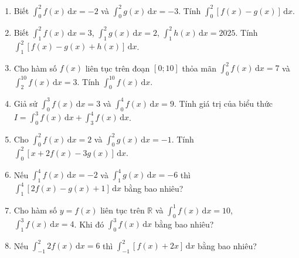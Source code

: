 \documentclass[12pt]{article}
\begin{document}
\begin{enumerate}[label=\textbf{Câu \arabic*.}]
		\item Biết $\displaystyle \int_0^2 f(x)\,\mathrm{d}x = -2$ và $\displaystyle \int_0^2 g(x)\,\mathrm{d}x = -3$. Tính $\displaystyle \int_0^2 [f(x)-g(x)]\,\mathrm{d}x$.
		\vspace{0.75cm}
		
		\item Biết $\displaystyle \int_1^2 f(x)\,\mathrm{d}x = 3$, $\displaystyle \int_1^2 g(x)\,\mathrm{d}x = 2$, $\displaystyle \int_1^2 h(x)\,\mathrm{d}x = 2025$. Tính $\displaystyle \int_1^2 [f(x)-g(x)+h(x)]\,\mathrm{d}x$.
		\vspace{0.75cm}
		
		\item Cho hàm số $f(x)$ liên tục trên đoạn $[0;10]$ thỏa mãn $\displaystyle \int_0^2 f(x)\,\mathrm{d}x = 7$ và $\displaystyle \int_2^{10} f(x)\,\mathrm{d}x = 3$. Tính $\displaystyle \int_0^{10} f(x)\,\mathrm{d}x$.
		\vspace{0.75cm}
		
		\item Giả sử $\displaystyle \int_0^3 f(x)\,\mathrm{d}x = 3$ và $\displaystyle \int_0^4 f(x)\,\mathrm{d}x = 9$. Tính giá trị của biểu thức $I = \displaystyle \int_0^3 f(x)\,\mathrm{d}x + \displaystyle \int_3^4 f(x)\,\mathrm{d}x$.
		\vspace{0.75cm}
		
		\item Cho $\displaystyle \int_0^2 f(x)\,\mathrm{d}x = 2$ và $\displaystyle \int_0^2 g(x)\,\mathrm{d}x = -1$. Tính $\displaystyle \int_0^2 [x+2f(x)-3g(x)]\,\mathrm{d}x$.
		\vspace{0.75cm}
		
		\item Nếu $\displaystyle \int_1^4 f(x)\,\mathrm{d}x = -2$ và $\displaystyle \int_1^4 g(x)\,\mathrm{d}x = -6$ thì $\displaystyle \int_1^4 [2f(x)-g(x)+1]\,\mathrm{d}x$ bằng bao nhiêu?
		\vspace{0.75cm}
		
		\item Cho hàm số $y = f(x)$ liên tục trên $\mathbb{R}$ và $\displaystyle \int_0^1 f(x)\,\mathrm{d}x = 10$, $\displaystyle \int_1^3 f(x)\,\mathrm{d}x = 4$. Khi đó $\displaystyle \int_0^3 f(x)\,\mathrm{d}x$ bằng bao nhiêu?
		\vspace{0.75cm}
		
		\item Nếu $\displaystyle \int_{-1}^2 2f(x)\,\mathrm{d}x = 6$ thì $\displaystyle \int_{-1}^2 [f(x)+2x]\,\mathrm{d}x$ bằng bao nhiêu?
		\vspace{0.75cm}
		

\end{enumerate}
\end{document}
